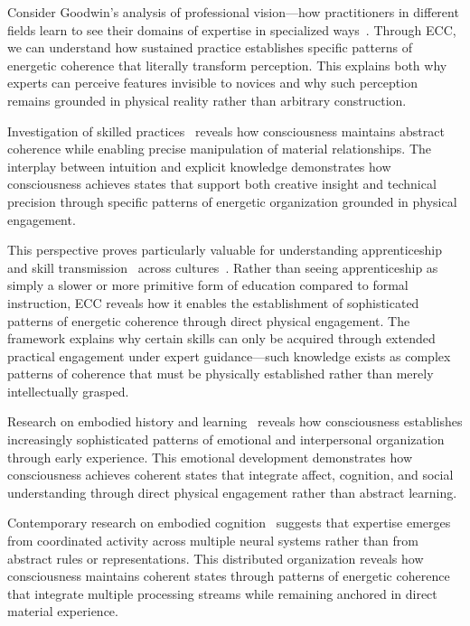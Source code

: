 Consider Goodwin's analysis of professional vision—how practitioners in different fields learn to see their domains of expertise in specialized ways~\cite{goodwin1994professional}. Through ECC, we can understand how sustained practice establishes specific patterns of energetic coherence that literally transform perception. This explains both why experts can perceive features invisible to novices and why such perception remains grounded in physical reality rather than arbitrary construction.

Investigation of skilled practices~\cite{marchand2010making,howes2003sensual} reveals how consciousness maintains abstract coherence while enabling precise manipulation of material relationships. The interplay between intuition and explicit knowledge demonstrates how consciousness achieves states that support both creative insight and technical precision through specific patterns of energetic organization grounded in physical engagement.

This perspective proves particularly valuable for understanding apprenticeship and skill transmission~ across cultures~\cite{marchand2010making}. Rather than seeing apprenticeship as simply a slower or more primitive form of education compared to formal instruction, ECC reveals how it enables the establishment of sophisticated patterns of energetic coherence through direct physical engagement. The framework explains why certain skills can only be acquired through extended practical engagement under expert guidance—such knowledge exists as complex patterns of coherence that must be physically established rather than merely intellectually grasped.

Research on embodied history and learning~\cite{toren1999mind,strathern2004partial} reveals how consciousness establishes increasingly sophisticated patterns of emotional and interpersonal organization through early experience. This emotional development demonstrates how consciousness achieves coherent states that integrate affect, cognition, and social understanding through direct physical engagement rather than abstract learning.

Contemporary research on embodied cognition~\cite{jackson1989knowledge,malafouris2013how} suggests that expertise emerges from coordinated activity across multiple neural systems rather than from abstract rules or representations. This distributed organization reveals how consciousness maintains coherent states through patterns of energetic coherence that integrate multiple processing streams while remaining anchored in direct material experience.


